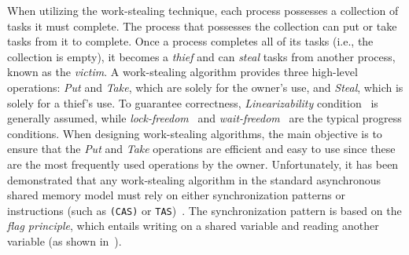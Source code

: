 When utilizing the work-stealing technique, each process possesses a collection of tasks it must complete. The process that possesses the collection can put or take tasks from it to complete. Once a process completes all of its tasks (i.e., the collection is empty), it becomes a \emph{thief} and can \emph{steal} tasks from another process, known as the \emph{victim}. A work-stealing algorithm provides three high-level operations: \emph{Put} and \emph{Take}, which are solely for the owner's use, and \emph{Steal}, which is solely for a thief's use. To guarantee correctness, \emph{Linearizability} condition~\cite{DBLP_journals_toplas_HerlihyW90}  is generally assumed, while \emph{lock-freedom}~\cite{DBLP_journals_toplas_HerlihyW90}  and \emph{wait-freedom}~\cite{DBLP_journals_toplas_Herlihy91} are the typical progress conditions. When designing work-stealing algorithms, the main objective is to ensure that the \emph{Put} and \emph{Take} operations are efficient and easy to use since these are the most frequently used operations by the owner. Unfortunately, it has been demonstrated that any work-stealing algorithm in the standard asynchronous shared memory model must rely on either \RAW synchronization patterns or \emph{\RMW} instructions (such as \CAS \texttt{(CAS)} or \TAS \texttt{TAS})~\cite{DBLP_conf_popl_AttiyaGHKMV11}. The \RAW synchronization pattern is based on the \emph{flag principle}, which entails writing on a shared variable and reading another variable (as shown in~\cite{DBLP_books_daglib_0020056}).

